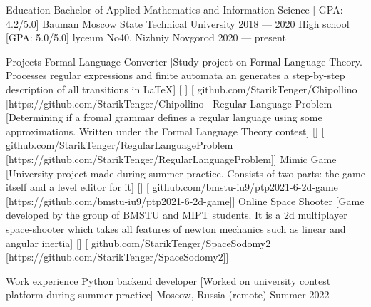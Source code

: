 \documentclass[
    compact
]{llresume}
\begin{document}
\makeheader

\begin{mainpane}
    \begin{mainsection}{Education}
        \entryJob
            {Bachelor of Applied Mathematics and Information Science}
            [ GPA: 4.2/5.0]
            {Bauman Moscow State Technical University}
            {2018 — 2020}
        \entryJob
            {High school}
            [GPA: 5.0/5.0]
            {lyceum No40, Nizhniy Novgorod}
            {2020 — present}
    \end{mainsection}


    \begin{mainsection}{Projects}
        \entryGeneric
            {Formal Language Converter}
            [Study project on Formal Language Theory. Processes regular expressions and finite automata an generates a step-by-step description of all transitions in LaTeX]
            [ ]
            [\infoGithub
                {github.com/StarikTenger/Chipollino}
                [https://github.com/StarikTenger/Chipollino]]
        \entryGeneric
            {Regular Language Problem}
            [Determining if a fromal grammar defines a regular language using some approximations. Written under the Formal Language Theory contest]
            []
            [\infoGithub
                {github.com/StarikTenger/RegularLanguageProblem}
                [https://github.com/StarikTenger/RegularLanguageProblem]]
        \entryGeneric
            {Mimic Game}
            [University project made during summer practice. Consists of two parts: the game itself and a level editor for it]
            []
            [\infoGithub
                {github.com/bmstu-iu9/ptp2021-6-2d-game}
                [https://github.com/bmstu-iu9/ptp2021-6-2d-game]]
        \entryGeneric
            {Online Space Shooter}
            [Game developed by the group of BMSTU and MIPT students. It is a 2d multiplayer space-shooter which takes all features of newton mechanics such as linear and angular inertia]
            []
            [\infoGithub
                {github.com/StarikTenger/SpaceSodomy2}
                [https://github.com/StarikTenger/SpaceSodomy2]]
    \end{mainsection}

    \begin{mainsection}{Work experience}
        \entryJob
            {Python backend developer}
            [Worked on university contest platform during summer practice]
            {Moscow, Russia (remote)}
            {Summer 2022}
    \end{mainsection}


\end{mainpane}
\end{document}
